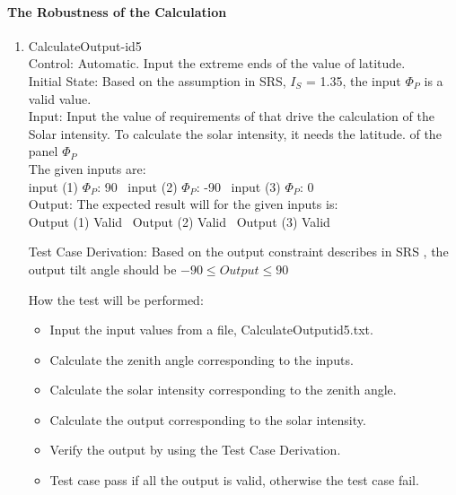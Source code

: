 \documentclass[12pt, titlepage]{article}
\begin{document}

\paragraph{The Robustness of the Calculation}

\begin{enumerate}
 

\item{CalculateOutput-id5\\}
Control: Automatic. Input the extreme ends of the value of latitude.\\

Initial State: Based on the assumption in SRS\cite{YS2019}, $I_{S}$ = 1.35, the input 
$\Phi_P$ is a valid value.\\

Input: Input the value of requirements of \progname that drive the calculation
of the Solar intensity. To calculate the solar intensity, it needs the latitude. of the panel $\Phi_P$\\

The given inputs are:\\ 
input (1) $\Phi_P$: 90 
~input (2) $\Phi_P$: -90 
~input (3) $\Phi_P$: 0\\


Output: The expected result will for the given inputs is:\\ 
Output (1) Valid
~Output (2) Valid
~Output (3) Valid \\



Test Case Derivation: Based on the output  constraint describes in SRS \cite{YS2019}, the 
output tilt angle should be $-90 \leq Output \leq 90$

How the test will be performed:
\begin{itemize}
\item Input the input values from a file, CalculateOutputid5.txt.
\item Calculate the zenith angle corresponding to the inputs.
\item Calculate the solar intensity corresponding to the zenith angle.
\item Calculate the output corresponding to the solar intensity.
\item Verify the output by using the Test Case Derivation.
\item Test case pass if all the output is valid,
otherwise the test case fail.
\end{itemize}
\end{enumerate}
\end{document}
